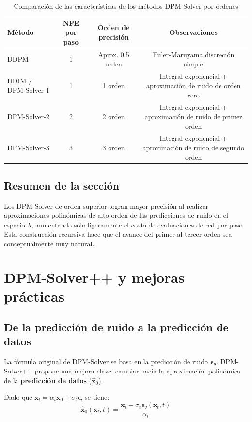 \documentclass[a4paper]{article}
\begin{document}
\begin{table}[H]
\centering
\begin{tabular}{lccc}
\toprule
\textbf{Método} & \textbf{NFE por paso} & \textbf{Orden de precisión} & \textbf{Observaciones} \\
\midrule
DDPM & 1 & Aprox. 0.5 orden & Euler-Maruyama discreción simple \\
DDIM / DPM-Solver-1 & 1 & 1 orden & Integral exponencial + aproximación de ruido de orden cero \\
DPM-Solver-2 & 2 & 2 orden & Integral exponencial + aproximación de ruido de primer orden \\
DPM-Solver-3 & 3 & 3 orden & Integral exponencial + aproximación de ruido de segundo orden \\
\bottomrule
\end{tabular}
\caption{Comparación de las características de los métodos DPM-Solver por órdenes}
\end{table}

\subsection{Resumen de la sección}

Los DPM-Solver de orden superior logran mayor precisión al realizar aproximaciones polinómicas de alto orden de las predicciones de ruido en el espacio $\lambda$, aumentando solo ligeramente el costo de evaluaciones de red por paso. Esta construcción recursiva hace que el avance del primer al tercer orden sea conceptualmente muy natural.
\section{DPM-Solver++ y mejoras prácticas}

\subsection{De la predicción de ruido a la predicción de datos}

La fórmula original de DPM-Solver se basa en la predicción de ruido $\boldsymbol{\epsilon}_\theta$. DPM-Solver++ propone una mejora clave: cambiar hacia la aproximación polinómica de la \textbf{predicción de datos} ($\hat{\mathbf{x}}_0$).

Dado que $\mathbf{x}_t = \alpha_t \mathbf{x}_0 + \sigma_t \boldsymbol{\epsilon}$, se tiene:
$$\hat{\mathbf{x}}_0(\mathbf{x}_t, t) = \frac{\mathbf{x}_t - \sigma_t \boldsymbol{\epsilon}_\theta(\mathbf{x}_t, t)}{\alpha_t}$$
\end{document}
